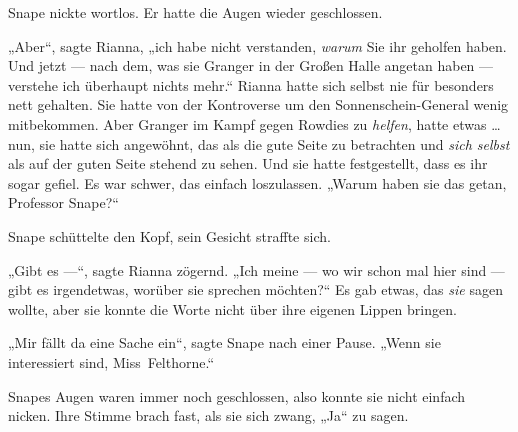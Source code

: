 Snape nickte wortlos. Er hatte die Augen wieder geschlossen.

„Aber“, sagte Rianna, „ich habe nicht verstanden, \emph{warum} Sie ihr geholfen haben. Und jetzt — nach dem, was sie Granger in der Großen Halle angetan haben — verstehe ich überhaupt nichts mehr.“ Rianna hatte sich selbst nie für besonders nett gehalten. Sie hatte von der Kontroverse um den Sonnenschein-General wenig mitbekommen. Aber Granger im Kampf gegen Rowdies zu \emph{helfen}, hatte etwas … nun, sie hatte sich angewöhnt, das als die gute Seite zu betrachten und \emph{sich selbst} als auf der guten Seite stehend zu sehen. Und sie hatte festgestellt, dass es ihr sogar gefiel. Es war schwer, das einfach loszulassen.
„Warum haben sie das getan, Professor Snape?“

Snape schüttelte den Kopf, sein Gesicht straffte sich.

„Gibt es —“, sagte Rianna zögernd.
„Ich meine — wo wir schon mal hier sind — gibt es irgendetwas, worüber sie sprechen möchten?“ Es gab etwas, das \emph{sie} sagen wollte, aber sie konnte die Worte nicht über ihre eigenen Lippen bringen.

„Mir fällt da eine Sache ein“, sagte Snape nach einer Pause.
„Wenn sie interessiert sind, Miss~Felthorne.“

Snapes Augen waren immer noch geschlossen, also konnte sie nicht einfach nicken. Ihre Stimme brach fast, als sie sich zwang,
„Ja“ zu sagen.

